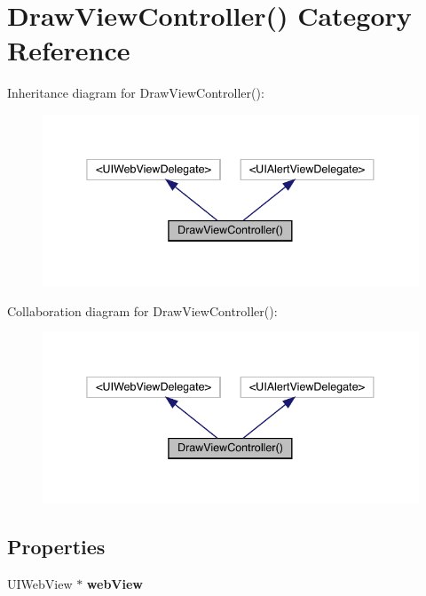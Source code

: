 \hypertarget{category_draw_view_controller_07_08}{}\section{Draw\+View\+Controller() Category Reference}
\label{category_draw_view_controller_07_08}


Inheritance diagram for Draw\+View\+Controller()\+:\nopagebreak
\begin{figure}[H]
\begin{center}
\leavevmode
\includegraphics[width=338pt]{category_draw_view_controller_07_08__inherit__graph}
\end{center}
\end{figure}


Collaboration diagram for Draw\+View\+Controller()\+:\nopagebreak
\begin{figure}[H]
\begin{center}
\leavevmode
\includegraphics[width=338pt]{category_draw_view_controller_07_08__coll__graph}
\end{center}
\end{figure}
\subsection*{Properties}
\begin{DoxyCompactItemize}
\item 
\mbox{\label{category_draw_view_controller_07_08_a8fa68feddac4d096487e985326f273c8}} 
U\+I\+Web\+View $\ast$ {\bfseries web\+View}
\end{DoxyCompactItemize}


